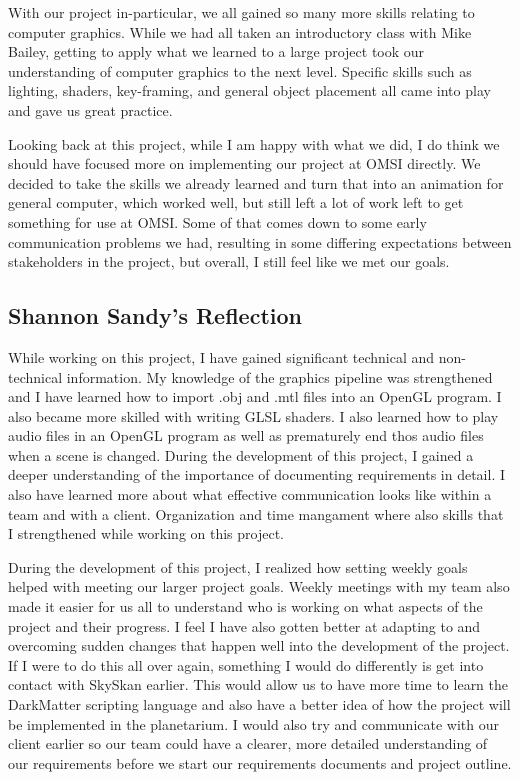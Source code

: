 \documentclass[onecolumn, draftclsnofoot,10pt, compsoc]{IEEEtran}
\begin{document}
With our project in-particular, we all gained so many more skills relating to computer graphics. While we had all taken an introductory class with Mike Bailey, getting to apply what we learned to a large project took our understanding of computer graphics to the next level. Specific skills such as lighting, shaders, key-framing, and general object placement all came into play and gave us great practice. 

Looking back at this project, while I am happy with what we did, I do think we should have focused more on implementing our project at OMSI directly. We decided to take the skills we already learned and turn that into an animation for general computer, which worked well, but still left a lot of work left to get something for use at OMSI. Some of that comes down to some early communication problems we had, resulting in some differing expectations between stakeholders in the project, but overall, I still feel like we met our goals. 


\subsection{Shannon Sandy's Reflection}
While working on this project, I have gained significant technical and non-technical information. My knowledge of the graphics pipeline was strengthened and I have learned how to import .obj and .mtl files into an OpenGL program. I also became more skilled with writing GLSL shaders. I also learned how to play audio files in an OpenGL program as well as prematurely end thos audio files when a scene is changed. During the development of this project, I gained a deeper understanding of the importance of documenting requirements in detail. I also have learned more about what effective communication looks like within a team and with a client. Organization and time mangament where also skills that I strengthened while working on this project.

During the development of this project, I realized how setting weekly goals helped with meeting our larger project goals. Weekly meetings with my team also made it easier for us all to understand who is working on what aspects of the project and their progress. I feel I have also gotten better at adapting to and overcoming sudden changes that happen well into the development of the project. If I were to do this all over again, something I would do differently is get into contact with SkySkan earlier. This would allow us to have more time to learn the DarkMatter scripting language and also have a better idea of how the project will be implemented in the planetarium. I would also try and communicate with our client earlier so our team could have a clearer, more detailed understanding of our requirements before we start our requirements documents and project outline.


\end{document}
